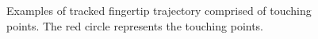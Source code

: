     \begin{figure}[!t]
        \centering
        \caption{Examples of tracked fingertip trajectory comprised of touching points. The red circle represents the touching points.}
        \label{fig:pins_trajectory}
        \vspace{-4mm}
    \end{figure}

